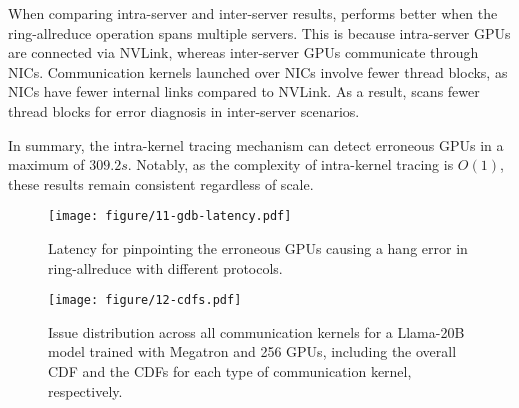 When comparing intra-server and inter-server results, \sysname{} performs better when the ring-allreduce operation spans multiple servers. This is because intra-server GPUs are connected via NVLink, whereas inter-server GPUs communicate through NICs. Communication kernels launched over NICs involve fewer thread blocks, as NICs have fewer internal links compared to NVLink. As a result, \sysname{} scans fewer thread blocks for error diagnosis in inter-server scenarios.

In summary, the intra-kernel tracing mechanism can detect erroneous GPUs in a maximum of $309.2s$. Notably, as the complexity of intra-kernel tracing is $O(1)$, these results remain consistent regardless of scale.

\begin{figure}
    \centering
    \texttt{[image: figure/11-gdb-latency.pdf]}
    \vspace{-2mm}
    \caption{Latency for pinpointing the erroneous GPUs causing a hang error in ring-allreduce with different protocols.}
    \label{fig:eval:intra-kernel}
    \vspace{-4mm}
\end{figure}
\begin{figure*}
    \centering
    \texttt{[image: figure/12-cdfs.pdf]}
    \vspace{-2mm}
    \caption{Issue distribution across all communication kernels for a Llama-20B model trained with Megatron and 256 GPUs, including the overall CDF and the CDFs for each type of communication kernel, respectively.}
    \label{fig:eval:issue-distribution}
    \vspace{-4mm}
\end{figure*}

